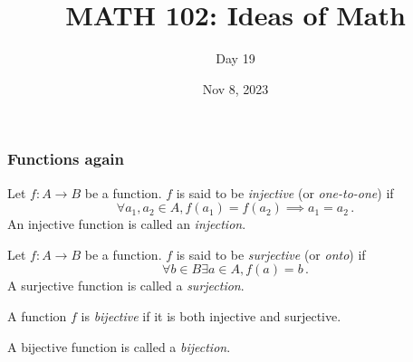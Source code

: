 \documentclass[aspectratio=169]{beamer}
\title{MATH 102: Ideas of Math}
\author{Day 19}
\date{Nov 8, 2023}
\begin{document}
\frame{\titlepage}
\begin{frame}
    \frametitle{ Functions again }
    \begin{definition}
        Let $f:A\to B$ be a function.
        $f$ is said to be \emph{injective} (or \emph{one-to-one})
        if 
        \begin{equation*}
            \forall a_1, a_2 \in A, f(a_1) = f(a_2) \implies a_1 = a_2 \,.
        \end{equation*}
        An injective function is called an \emph{injection}.
    \end{definition}

\end{frame}

\begin{frame}
    \begin{definition}
        Let $f:A\to B$ be a function.
        $f$ is said to be \emph{surjective} (or \emph{onto}) if
        \begin{equation*}
            \forall b\in B \exists a \in A, f(a) = b \,.
        \end{equation*}
        A surjective function is called a \emph{surjection}.
    \end{definition}
\end{frame}

\begin{frame}
    \begin{definition}
        A function $f$ is \emph{bijective} if 
        it is both injective and surjective.

        A bijective function is called a \emph{bijection}.
    \end{definition}
\end{frame}
\end{document}
